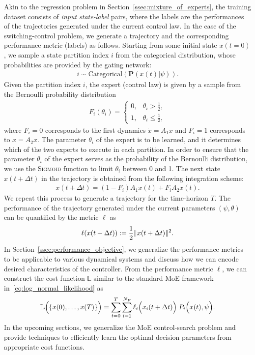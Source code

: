 Akin to the regression problem in Section~\ref{ssec:mixture_of_experts}, the
training dataset consists of \textit{input state-label} pairs, where the labels are
the performances of the trajectories generated under the current control law.
% 
In the case of the switching-control problem, we generate a trajectory and the
corresponding performance metric (labels) as follows.
%
Starting from some initial state $x(t=0)$, we sample a state partition index $i$
from the categorical distribution, whose probabilities are provided by the
gating network:
\begin{align*}
    i  \sim \text{Categorical} (\mathbf{P}(x(t)| \psi)).
\end{align*} 
Given the partition index $i$, the expert (control law) is given by a sample
from the Bernoulli probability distribution
\begin{align}
    F_i(\theta_i) = \begin{cases}
       0, & \theta_i > \frac{1}{2}, \\
       1, & \theta_i \leq \frac{1}{2},
    \end{cases}
    \label{eq:bernoulli}
\end{align}
\noindent where $F_i = 0$ corresponds to the first dynamics $\dot{x} = A_1 x$
and $F_i=1$ corresponds to $\dot{x} = A_2x$. The parameter $\theta_i$ of the
expert is to be learned, and it determines which of the two experts to
execute in each partition.
%
In order to ensure that the parameter $\theta_i$ of the expert serves as the
probability of the Bernoulli distribution, we use the \textsc{Sigmoid}
function\cite{sharma2017activation} to limit $\theta_i$ between 0 and 1.
%
The next state $x(t+\Delta t)$ in the trajectory is obtained from the following
integration scheme:
\begin{align*}
    x(t + \Delta t) = (1-F_i) A_1 x(t) + F_i A_2 x(t).
\end{align*}
%
We repeat this process to generate a trajectory for the time-horizon $T$.
%
The performance of the trajectory generated under the current parameters $(\psi,
\theta)$ can be quantified by the metric $\ell$ as
\begin{align*}
    \ell(x(t + \Delta t)) := \frac{1}{2} \|{x(t + \Delta t)}\|_{{}_{}}^2.
\end{align*}
In Section~\ref{ssec:performance_objective}, we generalize the performance
metrics to be applicable to various dynamical systems and discuss how we can
encode desired characteristics of the controller.
%
From the performance metric $\ell$, we can construct the cost function
$\mathbb{L}$ similar to the standard MoE framework
in~\eqref{eq:log_normal_likelihood} as
\begin{align*}
    \mathbb{L} \Bigl(\{x(0), \dots, x(T)\} \Bigr)= \sum_{t=0}^{T} \sum_{i=1}^{N_F} \ell_i \Bigl(x_i(t + \Delta t) \Bigr) \; P_i \Bigl(x(t), \psi \Bigr) .
\end{align*}
\noindent In the upcoming sections, we generalize the MoE control-search
problem and provide techniques to efficiently learn the optimal decision
parameters from appropriate cost functions.


